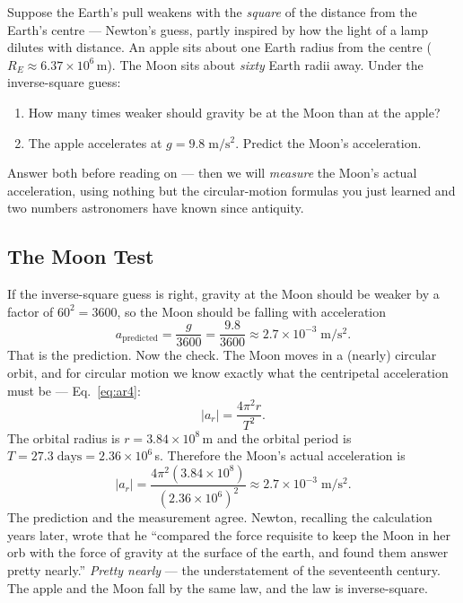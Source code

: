 \begin{predictbox}
Suppose the Earth's pull weakens with the \emph{square} of the distance from
the Earth's centre --- Newton's guess, partly inspired by how the light of a
lamp dilutes with distance. An apple sits about one Earth radius from the
centre ($R_E \approx 6.37\times10^6$\,m). The Moon sits about
\emph{sixty} Earth radii away. Under the inverse-square guess:
\begin{enumerate}[leftmargin=2em, itemsep=1pt]
  \item How many times weaker should gravity be at the Moon than at the apple?
  \item The apple accelerates at $g = 9.8\;\mathrm{m/s^2}$. Predict the Moon's
        acceleration.
\end{enumerate}
Answer both before reading on --- then we will \emph{measure} the Moon's actual
acceleration, using nothing but the circular-motion formulas you just learned
and two numbers astronomers have known since antiquity.
\end{predictbox}

\subsection{The Moon Test}

If the inverse-square guess is right, gravity at the Moon should be weaker by
a factor of $60^2 = 3600$, so the Moon should be falling with acceleration
\begin{equation*}
    a_{\text{predicted}} = \frac{g}{3600} = \frac{9.8}{3600}
    \approx 2.7\times10^{-3}\;\mathrm{m/s^2}.
\end{equation*}
That is the prediction. Now the check. The Moon moves in a (nearly) circular
orbit, and for circular motion we know exactly what the centripetal
acceleration must be --- Eq.~\eqref{eq:ar4}:
\begin{equation*}
    |a_r| = \frac{4\pi^2 r}{T^2}.
\end{equation*}
The orbital radius is $r = 3.84\times10^8$\,m and the orbital period is
$T = 27.3\;\text{days} = 2.36\times10^6$\,s. Therefore the Moon's actual
acceleration is
\begin{equation*}
    |a_r| = \frac{4\pi^2 (3.84\times10^8)}{(2.36\times10^6)^2}
    \approx 2.7\times10^{-3}\;\mathrm{m/s^2}.
\end{equation*}
The prediction and the measurement agree. Newton, recalling the calculation
years later, wrote that he ``compared the force requisite to keep the Moon in
her orb with the force of gravity at the surface of the earth, and found them
answer pretty nearly.'' \emph{Pretty nearly} --- the understatement of the
seventeenth century. The apple and the Moon fall by the same law, and the
law is inverse-square.

